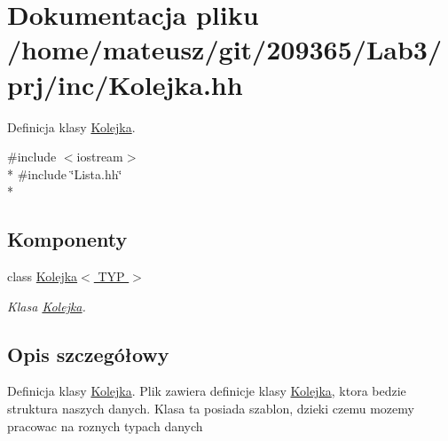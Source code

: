\hypertarget{_kolejka_8hh}{\section{Dokumentacja pliku /home/mateusz/git/209365/\-Lab3/prj/inc/\-Kolejka.hh}
\label{_kolejka_8hh}
}


Definicja klasy \hyperlink{class_kolejka}{Kolejka}.  


{\ttfamily \#include $<$iostream$>$}\\*
{\ttfamily \#include \char`\"{}Lista.\-hh\char`\"{}}\\*
\subsection*{Komponenty}
\begin{DoxyCompactItemize}
\item 
class \hyperlink{class_kolejka}{Kolejka$<$ T\-Y\-P $>$}
\begin{DoxyCompactList}\small\item\em Klasa \hyperlink{class_kolejka}{Kolejka}. \end{DoxyCompactList}\end{DoxyCompactItemize}


\subsection{Opis szczegółowy}
Definicja klasy \hyperlink{class_kolejka}{Kolejka}. Plik zawiera definicje klasy \hyperlink{class_kolejka}{Kolejka}, ktora bedzie struktura naszych danych. Klasa ta posiada szablon, dzieki czemu mozemy pracowac na roznych typach danych 